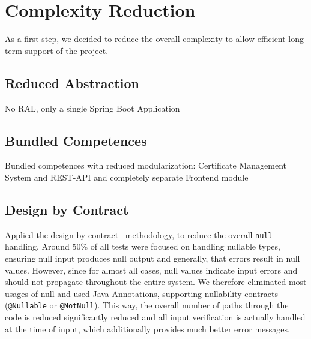 \section{Complexity Reduction}\label{sec:complexityReduction}
As a first step, we decided to reduce the overall complexity to allow efficient long-term support of the project.
\subsection*{Reduced Abstraction}
No RAL, only a single Spring Boot Application

\subsection*{Bundled Competences}
Bundled competences with reduced modularization: Certificate Management System and REST-API and completely separate
Frontend module

\subsection*{Design by Contract}
Applied the design by contract~\cite{meyer1992applying} methodology, to reduce the overall \lstinline{null} handling.
Around 50\% of all tests were focused on handling nullable types, ensuring null input produces null output and
generally, that errors result in null values.
However, since for almost all cases, null values indicate input errors and should not propagate throughout the entire
system.
We therefore eliminated most usages of null and used Java Annotations, supporting nullability contracts
(\lstinline{@Nullable} or \lstinline{@NotNull}).
This way, the overall number of paths through the code is reduced significantly reduced and all input verification is
actually handled at the time of input, which additionally provides much better error messages.

